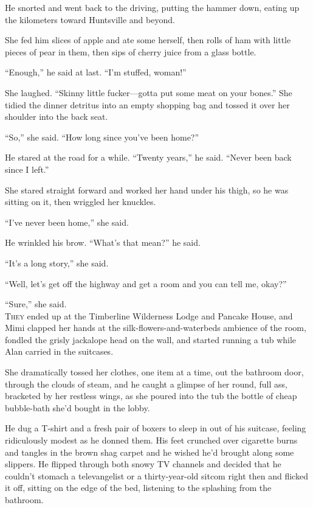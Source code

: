 He snorted and went back to the driving, putting the hammer down,
eating up the kilometers toward Huntsville and beyond.

She fed him slices of apple and ate some herself, then rolls of ham
with little pieces of pear in them, then sips of cherry juice from a
glass bottle.

``Enough,'' he said at last.  ``I'm stuffed, woman!''

She laughed.  ``Skinny little fucker---gotta put some meat on your
bones.'' She tidied the dinner detritus into an empty shopping bag and
tossed it over her shoulder into the back seat.

``So,'' she said.  ``How long since you've been home?''

He stared at the road for a while.  ``Twenty years,'' he said. 
``Never been back since I left.''

She stared straight forward and worked her hand under his thigh, so he
was sitting on it, then wriggled her knuckles.

``I've never been home,'' she said.

He wrinkled his brow.  ``What's that mean?'' he said.

``It's a long story,'' she said.

``Well, let's get off the highway and get a room and you can tell me,
okay?''

``Sure,'' she said.
\\
\lettrine[lines=3, lhang=.5, nindent=0pt, findent=2pt]{T}{hey} ended up at the Timberline Wilderness Lodge and Pancake House,
and Mimi clapped her hands at the silk-flowers-and-waterbeds ambience
of the room, fondled the grisly jackalope head on the wall, and
started running a tub while Alan carried in the suitcases.

She dramatically tossed her clothes, one item at a time, out the
bathroom door, through the clouds of steam, and he caught a glimpse of
her round, full ass, bracketed by her restless wings, as she poured
into the tub the bottle of cheap bubble-bath she'd bought in the
lobby.

He dug a T-shirt and a fresh pair of boxers to sleep in out of his
suitcase, feeling ridiculously modest as he donned them.  His feet
crunched over cigarette burns and tangles in the brown shag carpet and
he wished he'd brought along some slippers.  He flipped through both
snowy TV channels and decided that he couldn't stomach a televangelist
or a thirty-year-old sitcom right then and flicked it off, sitting on
the edge of the bed, listening to the splashing from the bathroom.

